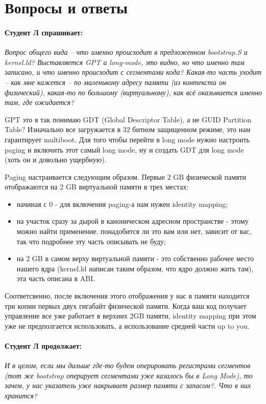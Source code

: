 \section{Вопросы и ответы}

\paragraph{Студент Л спрашивает:}
\emph{Вопрос общего вида -- что именно происходит в предложенном bootstrap.S и
kernel.ld? Выставляется GPT и long-mode, это видно, но что именно там записано,
и что именно происходит с сегментами кода? Какая-то часть уходит -- как мне
кажется -- по маленькому адресу памяти (из контекста он физический), какая-то
по большому (виртуальному), как всё оказывается именно там, где ожидается?}

GPT это я так понимаю GDT (Global Descriptor Table), а не GUID Partition Table?
Изначально все загружается в 32 битном защищенном режиме, это нам гарантирует
multiboot. Для того чтобы перейти в long mode нужно настроить paging и включить
этот самый long mode, ну и создать GDT для long mode (хоть он и довольно
ущербную).

Paging настраивается следующим образом. Первые 2 GB физической памяти
отображаются на 2 GB виртуальной памяти в трех местах:
\begin{itemize}
  \item начиная с 0 - для включения paging-а нам нужен identity mapping;
  \item на участок сразу за дырой в каноническом адресном пространстве - этому
        можно найти применение, понадобится ли это вам или нет, зависит от вас,
        так что подробнее эту часть описывать не буду;
  \item на 2 GB в самом верху виртуальной памяти - это собственно рабочее место
        нашего ядра (kernel.ld написан таким образом, что ядро должно жить там),
        эта часть описана в ABI.
\end{itemize}

Соответсвенно, после включения этого отображения у нас в памяти находится три
копии первых двух гигабайт физической памяти. Когда ваш код получает управление
все уже работает в верхних 2GB памяти, identity mapping при этом уже не
предполгается использовать, а использование средней части up to you.

\paragraph{Студент Л продолжает:}
\emph{И в целом, если мы дальше где-то будем оперировать регистрами сегментов (тот же bootstrap оперирует сегментами уже казалось бы в Long Mode), то зачем, у нас указатель уже накрывает размер памяти с запасом?. Что в них хранится?}

